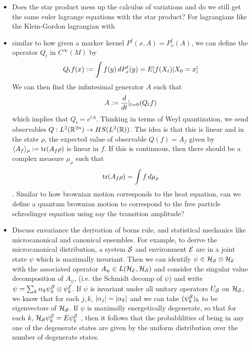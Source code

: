 \documentclass{book}
\begin{document}
\begin{itemize}
		\item Does the star product mess up the calculus of variations and do we still get the same euler lagrange equations with the star product? For lagrangians like the Klein-Gordon lagrangian with 
		\item {} similar to how given a markov kernel $P^t(x, A) = P^t_x(A)$, we can define the operator $Q_t$ in $C^{\infty}(M)$ by 
		$$Q_t f(x) \vcentcolon= \int f(y) \, dP^t_x(y) = E[f(X_t)|X_0 = x]$$
		We can then find the infintesimal generator $A$ such that 
		$$A \vcentcolon= \frac{d}{dt}|_{t=0}(Q_tf)$$ 
		which implies that $Q_t = e^{tA}$. Thinking in terms of Weyl quantization, we send observables $Q : L^2(\mathbb{R}^{2n}) \rightarrow HS(L^2(\mathbb{R}))$. The idea is that this is linear and in the state $\rho$, the expected value of observable $Q(f) = A_f$ given by $\langle A_f \rangle_{\rho} \vcentcolon= \operatorname{\text{tr}} (A_f \rho)$ is linear in $f$. If this is continuous, then there should be a complex measure $\mu_{\rho}$ such that 
		$$\operatorname{\text{tr}}(A_f \rho) = \int f \, d \mu_{\rho}$$. Similar to how brownian motion corresponds to the heat equation, can we define a quantum brownian motion to correspond to the free particle schrodinger equation using say the transition amplitude? 
		\item {} Discuss envariance the derivation of borns rule, and statistical mechanics like microcanonical and canonical ensembles. For example, to derive the microcanonical distribution, a system $\mathcal{S}$ and environment $\mathcal{E}$ are in a joint state $\psi$ which is maximally invariant. Then we can identify $\psi \in \mathcal{H}_{\mathcal{S}} \otimes \mathcal{H}_{\mathcal{E}}$ with the associated operator $A_{\psi} \in L(\mathcal{H}_{\mathcal{E}}, \mathcal{H}_{\mathcal{S}})$ and consider the singular value decomposition of $A_{\psi}$, (i.e. the Schmidt decomp of $\psi$) and write $\psi = \sum_{k} \alpha_k \psi^{\mathcal{S}}_k \otimes \psi^{\mathcal{E}}_k$. If $\psi$ is invariant under all unitary operators $U_{\mathcal{S}}$ on $\mathcal{H}_{\mathcal{S}}$, we know that for each $j, k$, $|\alpha_j| = |\alpha_k|$ and we can take $(\psi^{\mathcal{S}}_k)_k$ to be eigenvectors of $\mathcal{H}_{\mathcal{S}}$. If $\psi$ is maximally energetically degenerate, so that for each $k$, $\mathcal{H}_{\mathcal{S}} \psi^{\mathcal{S}}_k = E \psi^{\mathcal{S}}_k$ , then it follows that the probablilities of being in any one of the degenerate states are given by the uniform distribution over the number of degenerate states.  

\end{itemize}
\end{document}
